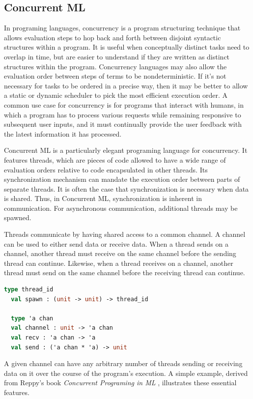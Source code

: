\documentclass[letterpaper, 11pt]{extarticle}
\begin{document}
\subsection{Concurrent ML}
In programing languages, concurrency is a program structuring technique that allows evaluation
steps to hop back and forth between disjoint syntactic structures within a program.
It is useful
when conceptually distinct tasks need to overlap in time, but are easier to understand if they
are written as distinct structures within the program. Concurrency languages may also allow the
evaluation order between steps of terms to be nondeterministic. If it's not necessary for
tasks to be ordered in a precise way, then it may be better to allow a static or dynamic
scheduler to pick the most efficient execution order. A common use case for concurrency
is for programs that interact with humans, in which a program has to process various requests
while remaining responsive to subsequent user inputs, and it must continually provide the user
feedback with the latest information it has processed.

Concurrent ML is a particularly elegant programing language for concurrency.
It features threads, which are pieces of code allowed to have a wide range of
evaluation orders relative to code encapsulated in other threads. Its synchronization
mechanism can mandate the execution order between parts of separate threads. It is often the
case that synchronization is necessary when data is shared. Thus, in Concurrent ML,
synchronization is inherent in communication. For asynchronous communication, additional threads may be spawned.

Threads communicate by having shared access to a common channel. A channel can be used to
either send data or receive data. When a thread sends on a channel, another thread must
receive on the same channel before the sending thread can continue. Likewise, when a thread
receives on a channel, another thread must send on the same channel before the receiving thread
can continue.

\begin{lstlisting}[language=ML]
  type thread_id
  val spawn : (unit -> unit) -> thread_id

  type 'a chan
  val channel : unit -> 'a chan
  val recv : 'a chan -> 'a
  val send : ('a chan * 'a) -> unit
  \end{lstlisting}

A given channel can have any arbitrary number of threads sending or receiving data on it over
the course of the program's execution. A simple example, derived from Reppy's book
\textit{Concurrent Programing in ML} \cite{reppy2007concurrent}, illustrates these essential
features.
\end{document}

